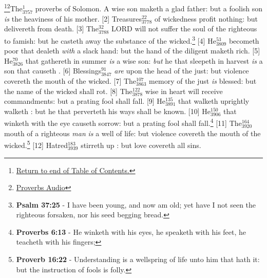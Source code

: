 \footnote{\textcolor[cmyk]{0.99998,1,0,0}{\hyperlink{TOC}{Return to end of Table of Contents.}}}\footnote{\href{https://www.audioverse.org/english/audiobibles/books/ENGKJV/O/Prov/1}{\textcolor[cmyk]{0.99998,1,0,0}{Proverbs Audio}}}\textcolor[cmyk]{0.99998,1,0,0}{The\textcolor{jungle}{$_{3757}^{1}$} proverbs of Solomon. A wise son maketh a glad father: but a foolish son \emph{is} the heaviness of his mother.}
[2] \textcolor[cmyk]{0.99998,1,0,0}{Treasures\textcolor{jungle}{$_{3778}^{22}$} of wickedness profit nothing: but  delivereth from death.}
[3] \textcolor[cmyk]{0.99998,1,0,0}{The\textcolor{jungle}{$_{3788}^{32}$} LORD will not suffer the soul of the righteous to famish: but he casteth away the substance of the wicked.}\footnote{\textbf{Psalm 37:25} - I have been young, and now am old; yet have I not seen the righteous forsaken, nor his seed begging bread.}
[4] \textcolor[cmyk]{0.99998,1,0,0}{He\textcolor{jungle}{$_{3809}^{53}$} becometh poor that dealeth \emph{with} a slack hand: but the hand of the diligent maketh rich.}
[5] \textcolor[cmyk]{0.99998,1,0,0}{He\textcolor{jungle}{$_{3826}^{70}$} that gathereth in summer \emph{is} a wise son: \emph{but} he that sleepeth in harvest \emph{is} a son that causeth .}
[6] \textcolor[cmyk]{0.99998,1,0,0}{Blessings\textcolor{jungle}{$_{3847}^{91}$} \emph{are} upon the head of the just: but violence covereth the mouth of the wicked.}
[7] \textcolor[cmyk]{0.99998,1,0,0}{The\textcolor{jungle}{$_{3863}^{107}$} memory of the just \emph{is} blessed: but the name of the wicked shall rot.}
[8] \textcolor[cmyk]{0.99998,1,0,0}{The\textcolor{jungle}{$_{3878}^{122}$} wise in heart will receive commandments: but a prating fool shall fall.}
[9] \textcolor[cmyk]{0.99998,1,0,0}{He\textcolor{jungle}{$_{3891}^{135}$} that walketh uprightly walketh : but he that perverteth his ways shall be known.}
[10] \textcolor[cmyk]{0.99998,1,0,0}{He\textcolor{jungle}{$_{3906}^{150}$} that winketh with the eye causeth sorrow: but a prating fool shall fall.}\footnote{\textbf{Proverbs 6:13} - He winketh with his eyes, he speaketh with his feet, he teacheth with his fingers;} 
[11] \textcolor[cmyk]{0.99998,1,0,0}{The\textcolor{jungle}{$_{3920}^{164}$} mouth of a righteous \emph{man} \emph{is} a well of life: but violence covereth the mouth of the wicked.}\footnote{\textbf{Proverb 16:22} - Understanding is a wellspring of life unto him that hath it: but the instruction of fools is folly.}
[12] \textcolor[cmyk]{0.99998,1,0,0}{Hatred\textcolor{jungle}{$_{3939}^{183}$} stirreth up : but love covereth all sins.}
